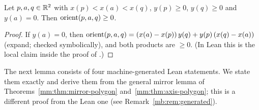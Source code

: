 \begin{lemma}\label{mb:lem:interior}
Let $p,a,q\in\mathbb R^2$ with $x(p)<x(a)<x(q)$, $y(p)\ge0$, $y(q)\ge0$ and $y(a)=0$. Then $\operatorname{orient}(p,a,q)\ge0$.
\end{lemma}

\begin{proof}
If $y(a)=0$, then $\operatorname{orient}(p,a,q)=(x(a)-x(p))\,y(q)+y(p)\,(x(q)-x(a))$ (expand; checked symbolically), and both products
are $\ge0$. (In Lean this is the local claim  inside the proof of .)
\end{proof}

The next lemma consists of four machine-generated Lean statements. We state them exactly and derive them from the
general mirror lemma of Theorems~\ref{mm:thm:mirror-polygon} and~\ref{mm:thm:axis-polygon}; this is a different proof
from the Lean one (see Remark~\ref{mb:rem:generated}).

